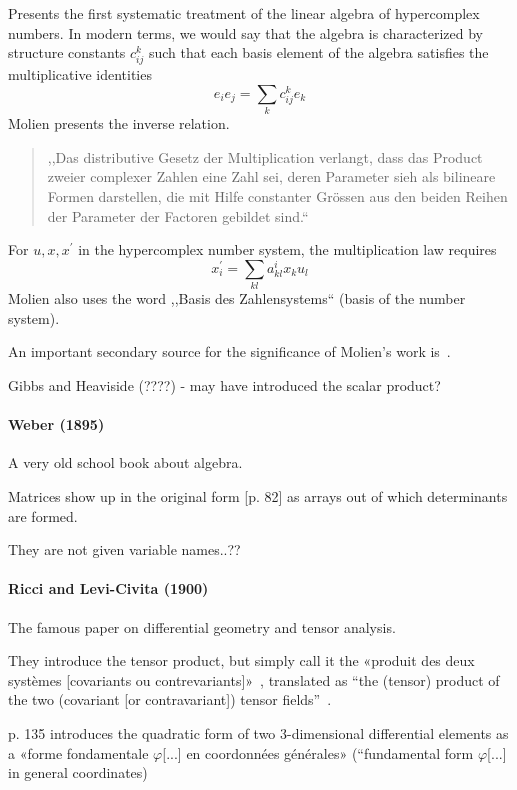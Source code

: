 Presents the first systematic treatment of the linear algebra of hypercomplex numbers.
In modern terms, we would say that the algebra is characterized by structure constants $c_{ij}^k$ such that each basis element of the algebra satisfies the multiplicative identities
\[
e_i e_j = \sum_k c^k_{ij} e_k
\]
Molien presents the inverse relation.
\begin{quote}
,,Das distributive Gesetz der Multiplication verlangt, dass das Product
zweier complexer Zahlen eine Zahl sei, deren Parameter sieh als bilineare
Formen darstellen, die mit Hilfe constanter Grössen aus den beiden
Reihen der Parameter der Factoren gebildet sind.``
\end{quote}
For $u, x, x^\prime$ in the hypercomplex number system, the multiplication law
requires
\[
x_i^\prime = \sum_{kl} a^i_{kl} x_k u_l
\]
Molien also uses the word ,,Basis des Zahlensystems`` (basis of the number system).

An important secondary source for the significance of Molien's work is~\cite{Hawkins1972}.

Gibbs and Heaviside (????) - may have introduced the scalar product?


\paragraph{Weber (1895)~\cite{Weber1895}}

A very old school book about algebra.

Matrices show up in the original form [p. 82] as arrays out of which determinants are formed.

They are not given variable names..??

\paragraph{Ricci and Levi-Civita (1900)~\cite{Ricci1900,Hermann1975}}

The famous paper on differential geometry and tensor analysis.

They introduce the tensor product, but simply call it the
«produit des deux systèmes [covariants ou contrevariants]»~\cite[p. 133]{Ricci1900}, translated as
``the (tensor) product of the two (covariant [or contravariant]) tensor fields''~\cite[p. 28]{Hermann1975}.

p. 135 introduces the quadratic form of two 3-dimensional differential elements as a «forme fondamentale $\varphi$[...] en coordonnées générales» (``fundamental form $\varphi$[...] in general coordinates)

